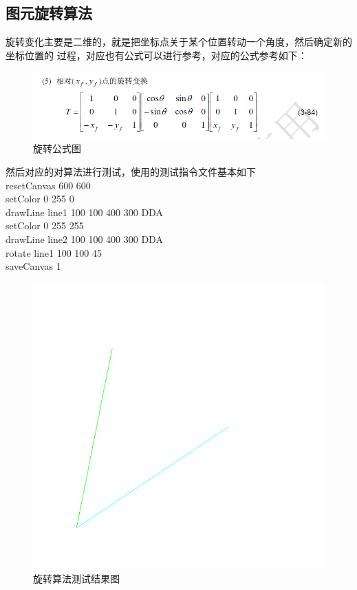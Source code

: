 \documentclass[a4paper,UTF8]{article}
\theoremstyle{definition}
\begin{document}
\subsection{图元旋转算法}
旋转变化主要是二维的，就是把坐标点关于某个位置转动一个角度，然后确定新的坐标位置的
过程，对应也有公式可以进行参考，对应的公式参考如下：

\begin{figure}[h]
	\centering
	\includegraphics[scale=0.5]{figure/rotate.png}
	\caption{旋转公式图}
	\label{fig:rotate-alg}
\end{figure}

然后对应的对算法进行测试，使用的测试指令文件基本如下\\

resetCanvas 600 600\\

setColor 0 255 0\\

drawLine line1 100 100 400 300 DDA\\

setColor 0 255 255\\

drawLine line2 100 100 400 300 DDA\\

rotate line1 100 100 45\\

saveCanvas 1\\

\begin{figure}[h]
	\centering
	\includegraphics[scale=0.4]{figure/rotate_test.png}
	\caption{旋转算法测试结果图}
	\label{fig:rotate-result}
\end{figure}
\end{document}

